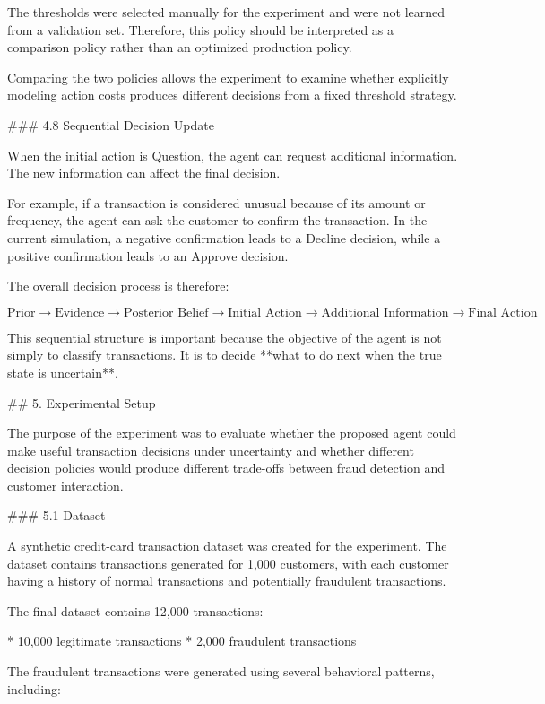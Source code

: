The thresholds were selected manually for the experiment and were not learned from a validation set. Therefore, this policy should be interpreted as a comparison policy rather than an optimized production policy.

Comparing the two policies allows the experiment to examine whether explicitly modeling action costs produces different decisions from a fixed threshold strategy.

### 4.8 Sequential Decision Update

When the initial action is Question, the agent can request additional information. The new information can affect the final decision.

For example, if a transaction is considered unusual because of its amount or frequency, the agent can ask the customer to confirm the transaction. In the current simulation, a negative confirmation leads to a Decline decision, while a positive confirmation leads to an Approve decision.

The overall decision process is therefore:

$$
\text{Prior}
\rightarrow
\text{Evidence}
\rightarrow
\text{Posterior Belief}
\rightarrow
\text{Initial Action}
\rightarrow
\text{Additional Information}
\rightarrow
\text{Final Action}
$$

This sequential structure is important because the objective of the agent is not simply to classify transactions. It is to decide **what to do next when the true state is uncertain**.

## 5. Experimental Setup

The purpose of the experiment was to evaluate whether the proposed agent could make useful transaction decisions under uncertainty and whether different decision policies would produce different trade-offs between fraud detection and customer interaction.

### 5.1 Dataset

A synthetic credit-card transaction dataset was created for the experiment. The dataset contains transactions generated for 1,000 customers, with each customer having a history of normal transactions and potentially fraudulent transactions.

The final dataset contains 12,000 transactions:

* 10,000 legitimate transactions
* 2,000 fraudulent transactions

The fraudulent transactions were generated using several behavioral patterns, including:

